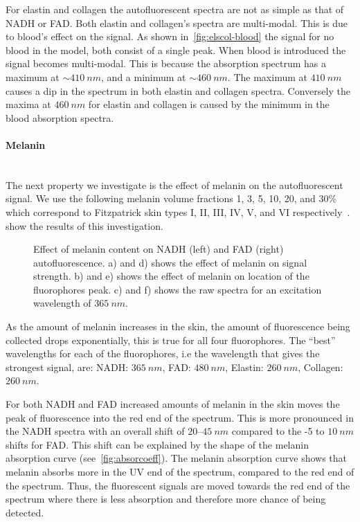 For elastin and collagen the autofluorescent spectra are not as simple as that of NADH or FAD\@.
Both elastin and collagen's spectra are multi-modal.
This is due to blood's effect on the signal.
As shown in~\cref{fig:elscol-blood} the signal for no blood in the model, both consist of a single peak.
When blood is introduced the signal becomes multi-modal.
This is because the absorption spectrum has a maximum at $\sim410~nm$, and a minimum at $\sim460~nm$.
The maximum at $410~nm$ causes a dip in the spectrum in both elastin and collagen spectra.
Conversely the maxima at $460~nm$ for elastin and collagen is caused by the minimum in the blood absorption spectra.


\paragraph*{Melanin}\hspace{0pt}\\
The next property we investigate is the effect of melanin on the autofluorescent signal.
We use the following melanin volume fractions 1, 3, 5, 10, 20, and $30\%$ which correspond to Fitzpatrick skin types I, II, III, IV, V, and VI respectively~\cite{iglesias2015biophysically,fitzpatrick1988validity}.
 show the results of this investigation.

\begin{figure}[!htbp]
    \centering
    \caption{Effect of melanin content on NADH (left) and FAD (right) autofluorescence. a) and d) shows the effect of melanin on signal strength. b) and e) shows the effect of melanin on location of the fluorophores peak. c) and f) shows the raw spectra for an excitation wavelength of $365~nm$.}%
    \label{fig:nadhfad-mel}%
\end{figure}

As the amount of melanin increases in the skin, the amount of fluorescence being collected drops exponentially, this is true for all four fluorophores.
The ``best'' wavelengths for each of the fluorophores, i.e the wavelength that gives the strongest signal, are: NADH: $365~nm$, FAD: $480~nm$, Elastin: $260~nm$, Collagen: $260~nm$.

For both NADH and FAD increased amounts of melanin in the skin moves the peak of fluorescence into the red end of the spectrum.
This is more pronounced in the NADH spectra with an overall shift of $20$--$45~nm$ compared to the -5 to $10~nm$ shifts for FAD\@.
This shift can be explained by the shape of the melanin absorption curve (see~\cref{fig:absorcoeff}).
The melanin absorption curve shows that melanin absorbs more in the UV end of the spectrum, compared to the red end of the spectrum.
Thus, the fluorescent signals are moved towards the red end of the spectrum where there is less absorption and therefore more chance of being detected.

